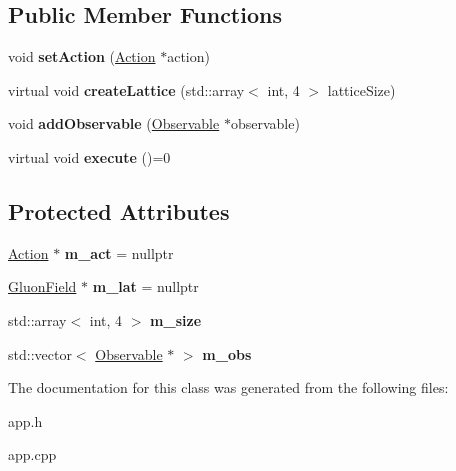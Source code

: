 \subsection*{Public Member Functions}
\begin{DoxyCompactItemize}
\item 
void {\bfseries set\+Action} (\hyperlink{classAction}{Action} $\ast$action)\hypertarget{classApp_a521478e111127d2166d2e897b9900eb5}{}\label{classApp_a521478e111127d2166d2e897b9900eb5}

\item 
virtual void {\bfseries create\+Lattice} (std\+::array$<$ int, 4 $>$ lattice\+Size)\hypertarget{classApp_a8f35d6814a0306dd31c7c583f6c8d92c}{}\label{classApp_a8f35d6814a0306dd31c7c583f6c8d92c}

\item 
void {\bfseries add\+Observable} (\hyperlink{classObservable}{Observable} $\ast$observable)\hypertarget{classApp_a4796925a8a54cfe4456419b94160746e}{}\label{classApp_a4796925a8a54cfe4456419b94160746e}

\item 
virtual void {\bfseries execute} ()=0\hypertarget{classApp_a060dd95f437842171d448ac822dfa983}{}\label{classApp_a060dd95f437842171d448ac822dfa983}

\end{DoxyCompactItemize}
\subsection*{Protected Attributes}
\begin{DoxyCompactItemize}
\item 
\hyperlink{classAction}{Action} $\ast$ {\bfseries m\+\_\+act} = nullptr\hypertarget{classApp_a891ae68e54bb04fcf74579c62a8d5860}{}\label{classApp_a891ae68e54bb04fcf74579c62a8d5860}

\item 
\hyperlink{classField}{Gluon\+Field} $\ast$ {\bfseries m\+\_\+lat} = nullptr\hypertarget{classApp_a58776f77facca2185bf53974b05a7280}{}\label{classApp_a58776f77facca2185bf53974b05a7280}

\item 
std\+::array$<$ int, 4 $>$ {\bfseries m\+\_\+size}\hypertarget{classApp_a8ca118f6637bfd14129ba61f985876d7}{}\label{classApp_a8ca118f6637bfd14129ba61f985876d7}

\item 
std\+::vector$<$ \hyperlink{classObservable}{Observable} $\ast$ $>$ {\bfseries m\+\_\+obs}\hypertarget{classApp_af2803baf8aaf959201b28fb16a46a3d4}{}\label{classApp_af2803baf8aaf959201b28fb16a46a3d4}

\end{DoxyCompactItemize}


The documentation for this class was generated from the following files\+:\begin{DoxyCompactItemize}
\item 
app.\+h\item 
app.\+cpp\end{DoxyCompactItemize}
